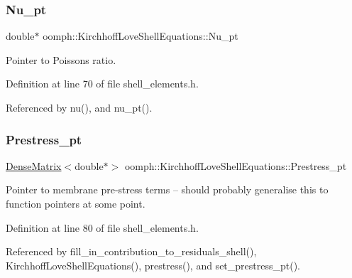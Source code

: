 \subsubsection{\texorpdfstring{Nu\+\_\+pt}{Nu\_pt}}
{\footnotesize\ttfamily double$\ast$ oomph\+::\+Kirchhoff\+Love\+Shell\+Equations\+::\+Nu\+\_\+pt\hspace{0.3cm}{\ttfamily [private]}}



Pointer to Poisson\textquotesingle{}s ratio. 



Definition at line 70 of file shell\+\_\+elements.\+h.



Referenced by nu(), and nu\+\_\+pt().

\mbox{\label{classoomph_1_1KirchhoffLoveShellEquations_a6e2455e49a707f5ffdf8439a6dffcea9}} 
\subsubsection{\texorpdfstring{Prestress\+\_\+pt}{Prestress\_pt}}
{\footnotesize\ttfamily \hyperlink{classoomph_1_1DenseMatrix}{Dense\+Matrix}$<$double$\ast$$>$ oomph\+::\+Kirchhoff\+Love\+Shell\+Equations\+::\+Prestress\+\_\+pt\hspace{0.3cm}{\ttfamily [private]}}



Pointer to membrane pre-\/stress terms -- should probably generalise this to function pointers at some point. 



Definition at line 80 of file shell\+\_\+elements.\+h.



Referenced by fill\+\_\+in\+\_\+contribution\+\_\+to\+\_\+residuals\+\_\+shell(), Kirchhoff\+Love\+Shell\+Equations(), prestress(), and set\+\_\+prestress\+\_\+pt().

\mbox{\label{classoomph_1_1KirchhoffLoveShellEquations_aec919dec7bab41fe5f7012ae8ebc8411}} 
